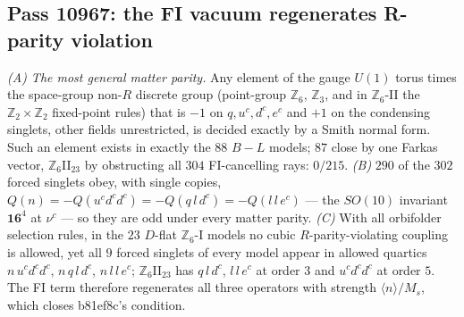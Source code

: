 \subsection{Pass 10967: the FI vacuum regenerates R-parity violation}

\emph{(A) The most general matter parity.} Any element of the gauge $U(1)$ torus times the
space-group non-$R$ discrete group (point-group $\mathbb{Z}_6$, $\mathbb{Z}_3$, and in
$\mathbb{Z}_6$-II the $\mathbb{Z}_2\times\mathbb{Z}_2$ fixed-point rules) that is $-1$ on
$q,u^c,d^c,e^c$ and $+1$ on the condensing singlets, other fields unrestricted, is decided exactly
by a Smith normal form.  Such an element exists in exactly the $88$ $B-L$ models; $87$ close by one
Farkas vector, $\mathbb{Z}_6$II$_{23}$ by obstructing all $304$ FI-cancelling rays: $0/215$.
\emph{(B)} $290$ of the $302$ forced singlets obey, with single copies,
$Q(n)=-Q(u^cd^cd^c)=-Q(q\,l\,d^c)=-Q(l\,l\,e^c)$ --- the $SO(10)$ invariant $\mathbf{16}^4$ at
$\nu^c$ --- so they are odd under every matter parity.
\emph{(C)} With all orbifolder selection rules, in the $23$ $D$-flat $\mathbb{Z}_6$-I models no
cubic $R$-parity-violating coupling is allowed, yet all $9$ forced singlets of every model appear
in allowed quartics $n\,u^cd^cd^c$, $n\,q\,l\,d^c$, $n\,l\,l\,e^c$; $\mathbb{Z}_6$II$_{23}$ has
$q\,l\,d^c$, $l\,l\,e^c$ at order $3$ and $u^cd^cd^c$ at order $5$.  The FI term therefore
regenerates all three operators with strength $\langle n\rangle/M_s$, which closes b81ef8c's
condition.
